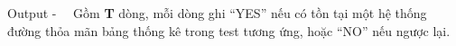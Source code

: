 Output
-   Gồm \textbf{ T } dòng, mỗi dòng ghi “YES” nếu có tồn tại một hệ thống đường thỏa mãn bảng thống kê trong test tương ứng, hoặc “NO” nếu ngược lại.